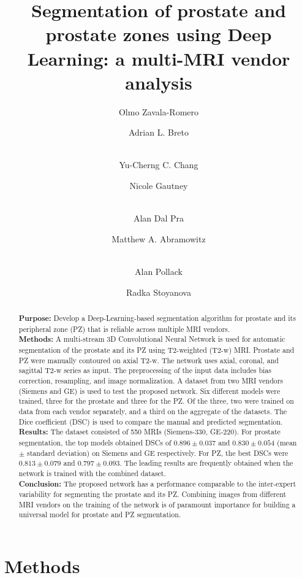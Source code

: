 \documentclass[num-refs]{wiley-article}
\title{ Segmentation of prostate and prostate zones using Deep Learning: a multi-MRI vendor analysis}
\author[1]{Olmo Zavala-Romero}
\author[1]{Adrian L. Breto}
\author[2]{\\Yu-Cherng C. Chang}
\author[1]{Nicole Gautney}
\author[1]{\\Alan Dal Pra}
\author[1]{Matthew A. Abramowitz}
\author[1]{\\Alan Pollack}
\author[1]{Radka Stoyanova}
\affil[1]{Department of Radiation Oncology, University of Miami Miller School of Medicine,
                Miami, FL, 33136, USA}
\affil[2]{University of Miami Miller School of Medicine,
                Miami, FL, 33136, USA}
\begin{document}
\maketitle

\begin{abstract} %
\textbf{Purpose:} Develop a Deep-Learning-based segmentation algorithm for prostate and its peripheral zone (PZ) that is reliable across multiple MRI vendors. \\
\textbf{Methods:} A multi-stream 3D Convolutional Neural Network is used for automatic segmentation of the prostate and its PZ using T2-weighted (T2-w) MRI. Prostate and PZ were manually contoured on axial T2-w. The network uses axial, coronal, and sagittal T2-w series as input. The preprocessing of the input data includes bias correction, resampling, and image normalization. A dataset from two MRI vendors (Siemens and GE) is used to test the proposed network. Six different models were trained, three for the prostate and three for the PZ. Of the three, two were trained on data from each vendor separately, and a third on the aggregate of the datasets. The Dice coefficient (DSC) is used to compare the manual and predicted segmentation. \\
\textbf{Results:} The dataset consisted of 550 MRIs (Siemens-330, GE-220). 
For prostate segmentation, the top models obtained DSCs of $0.896 \pm 0.037$ and  $0.830 \pm 0.054$ (mean $\pm$ standard deviation) on Siemens and GE respectively. For PZ, the best DSCs were $0.813 \pm 0.079$ and $0.797 \pm 0.093$. The leading results are frequently obtained when the network is trained with the combined dataset. \\
\textbf{Conclusion:} The proposed network has a performance comparable to the inter-expert variability for segmenting the prostate and its PZ. Combining images from different MRI vendors on the training of the network is of paramount importance for building a universal model for prostate and PZ segmentation. 
\end{abstract}

\section{Methods}
\label{sec:methods}





\end{document}
